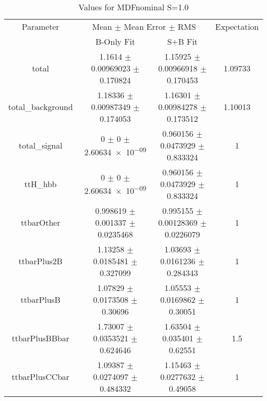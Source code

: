\begin{table}
\centering
\caption{Values for MDFnominal S=1.0}
\begin{tabular}{cccc}
\toprule
Parameter & \multicolumn{2}{c}{Mean $\pm$ Mean Error $\pm$ RMS} & Expectation\\
 & B-Only Fit & S+B Fit & \\
\midrule
total & \num{1.1614} $\pm$ \num{0.00969023} $\pm$ \num{0.170824} & \num{1.15925} $\pm$ \num{0.00966918} $\pm$ \num{0.170453} & \num{1.09733}\\
total\_background & \num{1.18336} $\pm$ \num{0.00987349} $\pm$ \num{0.174053} & \num{1.16301} $\pm$ \num{0.00984278} $\pm$ \num{0.173512} & \num{1.10013}\\
total\_signal & \num{0} $\pm$ \num{0} $\pm$ \num{2.60634e-09} & \num{0.960156} $\pm$ \num{0.0473929} $\pm$ \num{0.833324} & \num{1}\\
ttH\_hbb & \num{0} $\pm$ \num{0} $\pm$ \num{2.60634e-09} & \num{0.960156} $\pm$ \num{0.0473929} $\pm$ \num{0.833324} & \num{1}\\
ttbarOther & \num{0.998619} $\pm$ \num{0.001337} $\pm$ \num{0.0235468} & \num{0.995155} $\pm$ \num{0.00128369} $\pm$ \num{0.0226079} & \num{1}\\
ttbarPlus2B & \num{1.13258} $\pm$ \num{0.0185481} $\pm$ \num{0.327099} & \num{1.03693} $\pm$ \num{0.0161236} $\pm$ \num{0.284343} & \num{1}\\
ttbarPlusB & \num{1.07829} $\pm$ \num{0.0173508} $\pm$ \num{0.30696} & \num{1.05553} $\pm$ \num{0.0169862} $\pm$ \num{0.30051} & \num{1}\\
ttbarPlusBBbar & \num{1.73007} $\pm$ \num{0.0353521} $\pm$ \num{0.624646} & \num{1.63504} $\pm$ \num{0.035401} $\pm$ \num{0.62551} & \num{1.5}\\
ttbarPlusCCbar & \num{1.09387} $\pm$ \num{0.0274097} $\pm$ \num{0.484332} & \num{1.15463} $\pm$ \num{0.0277632} $\pm$ \num{0.49058} & \num{1}\\
\bottomrule
\end{tabular}
\end{table}
